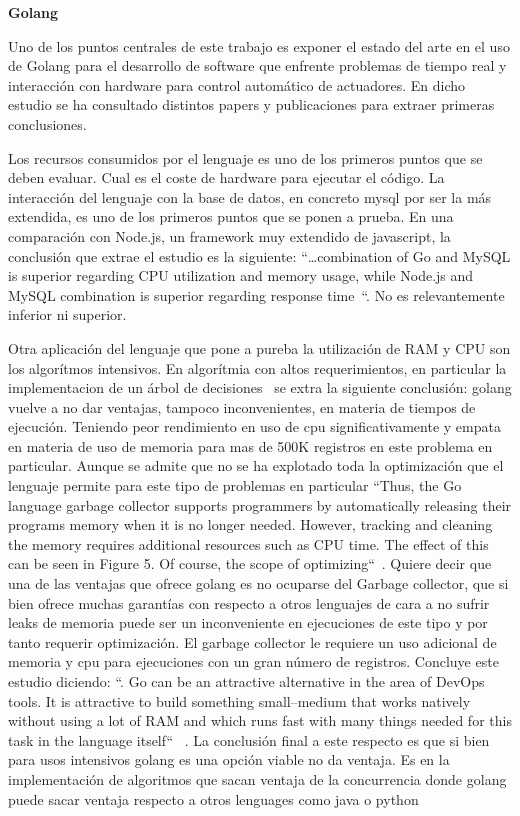 \textbf{Golang}

Uno de los puntos centrales de este trabajo es exponer el estado del arte en el uso de Golang para el desarrollo de software que enfrente problemas de tiempo real y interacción con hardware para control automático de actuadores.
En dicho estudio se ha consultado distintos papers y publicaciones para extraer primeras conclusiones.

Los recursos consumidos por el lenguaje es uno de los primeros puntos que se deben evaluar.
Cual es el coste de hardware para ejecutar el código.
La interacción del lenguaje con la base de datos, en concreto mysql por ser la más extendida, es uno de los primeros puntos que se ponen a prueba.
En una comparación con Node.js, un framework muy extendido de javascript, la conclusión que extrae el estudio es la siguiente: “\ldots combination of Go and MySQL is superior regarding CPU utilization and memory usage, while Node.js and MySQL combination is superior regarding response time~\cite{Effendy20211955}“. No es relevantemente inferior ni superior.

Otra aplicación del lenguaje que pone a pureba la utilización de RAM y CPU son los algorítmos intensivos.
En algorítmia con altos requerimientos, en particular la implementacion de un árbol de decisiones~\cite{Dymora20201} se extra la siguiente conclusión: golang vuelve a no dar ventajas, tampoco inconvenientes, en materia de tiempos de ejecución.
Teniendo peor rendimiento en uso de cpu significativamente y empata en materia de uso de memoria para mas de 500K registros en este problema en particular.
Aunque se admite que no se ha explotado toda la optimización que el lenguaje permite para este tipo de problemas en particular “Thus, the Go language garbage collector supports programmers by automatically releasing their programs memory when it is no longer needed.
However, tracking and cleaning the memory requires additional resources such as CPU time.
The effect of this can be seen in Figure 5.
Of course, the scope of optimizing“~\cite{Dymora20201}.
Quiere decir que una de las ventajas que ofrece golang es no ocuparse del Garbage collector, que si bien ofrece muchas garantías con respecto a otros lenguajes de cara a no sufrir leaks de memoria puede ser un inconveniente en ejecuciones de este tipo y por tanto requerir optimización.
El garbage collector le requiere un uso adicional de memoria y cpu para ejecuciones con un gran número de registros.
Concluye este estudio diciendo: “.
Go can be an attractive alternative in the area of DevOps tools.
It is attractive to build something small–medium that works natively without using a lot of RAM and which runs fast with many things needed for this task in the language itself“ ~\cite{Dymora20201}.
La conclusión final a este respecto es que si bien para usos intensivos golang es una opción viable no da ventaja.
Es en la implementación de algoritmos que sacan ventaja de la concurrencia donde golang puede sacar ventaja respecto a otros lenguages como java o python ~\cite{Jenkins201714}

